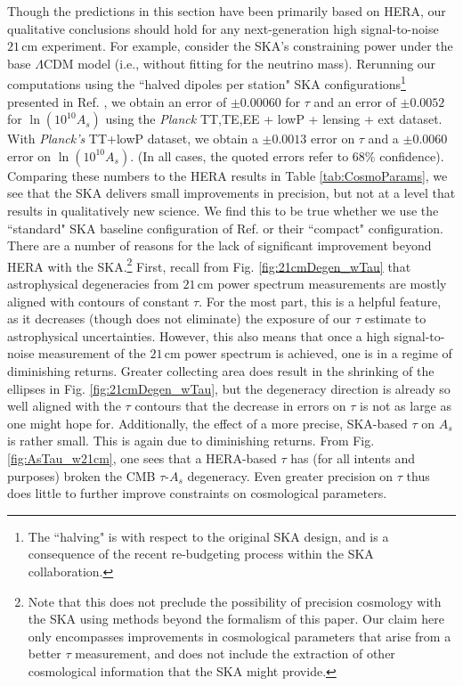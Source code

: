 \documentclass[twocolumn,aps,prd,nofootinbib,showpacs,superscriptaddress]{revtex4-1}
\begin{document}
Though the predictions in this section have been primarily based on HERA, our qualitative conclusions should hold for any next-generation high signal-to-noise $21\,\textrm{cm}$ experiment. For example, consider the SKA's constraining power under the base $\Lambda$CDM model (i.e., without fitting for the neutrino mass). Rerunning our computations using the ``halved dipoles per station" SKA configurations\footnote{The ``halving" is with respect to the original SKA design, and is a consequence of the recent re-budgeting process within the SKA collaboration.} presented in Ref. \cite{greig_et_al2015b}, we obtain an error of $\pm 0.00060$ for $\tau$ and an error of $\pm 0.0052$ for $\ln (10^{10} A_s)$ using the \emph{Planck} TT,TE,EE + lowP + lensing + ext dataset. With \emph{Planck's} TT+lowP dataset, we obtain a $\pm 0.0013$ error on $\tau$ and a $\pm 0.0060$ error on $\ln (10^{10} A_s)$. (In all cases, the quoted errors refer to $68\%$ confidence). Comparing these numbers to the HERA results in Table \ref{tab:CosmoParams}, we see that the SKA delivers small improvements in precision, but not at a level that results in qualitatively new science.  We find this to be true whether we use the ``standard" SKA baseline configuration of Ref. \cite{greig_et_al2015b} or their ``compact" configuration. There are a number of reasons for the lack of significant improvement beyond HERA with the SKA.\footnote{Note that this does not preclude the possibility of precision cosmology with the SKA using methods beyond the formalism of this paper. Our claim here only encompasses improvements in cosmological parameters that arise from a better $\tau$ measurement, and does not include the extraction of other cosmological information that the SKA might provide.} First, recall from Fig. \ref{fig:21cmDegen_wTau} that astrophysical degeneracies from $21\,\textrm{cm}$ power spectrum measurements are mostly aligned with contours of constant $\tau$. For the most part, this is a helpful feature, as it decreases (though does not eliminate) the exposure of our $\tau$ estimate to astrophysical uncertainties. However, this also means that once a high signal-to-noise measurement of the $21\,\textrm{cm}$ power spectrum is achieved, one is in a regime of diminishing returns. Greater collecting area does result in the shrinking of the ellipses in Fig. \ref{fig:21cmDegen_wTau}, but the degeneracy direction is already so well aligned with the $\tau$ contours that the decrease in errors on $\tau$ is not as large as one might hope for. Additionally, the effect of a more precise, SKA-based $\tau$ on $A_s$ is rather small. This is again due to diminishing returns. From Fig. \ref{fig:AsTau_w21cm}, one sees that a HERA-based $\tau$ has (for all intents and purposes) broken the CMB $\tau$-$A_s$ degeneracy. Even greater precision on $\tau$ thus does little to further improve constraints on cosmological parameters.
\end{document}
